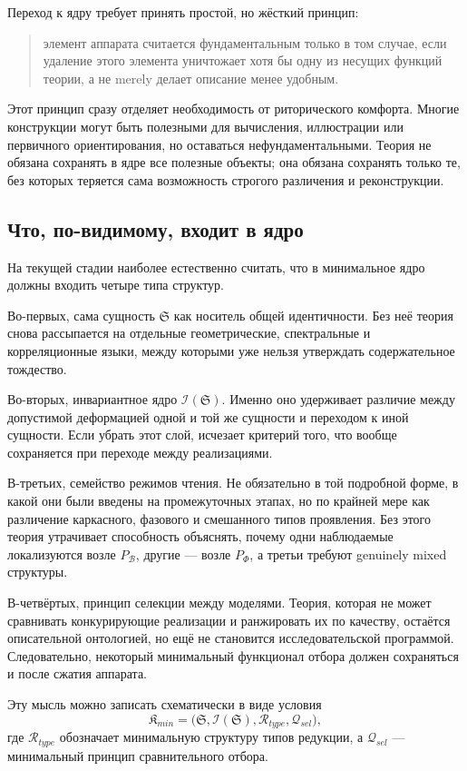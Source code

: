 \documentclass[12pt,a4paper]{article}
\begin{document}
Переход к ядру требует принять простой, но жёсткий принцип:
\begin{quote}
элемент аппарата считается фундаментальным только в том случае, если удаление этого элемента уничтожает хотя бы одну из несущих функций теории, а не merely делает описание менее удобным.
\end{quote}

Этот принцип сразу отделяет необходимость от риторического комфорта. Многие конструкции могут быть полезными для вычисления, иллюстрации или первичного ориентирования, но оставаться нефундаментальными. Теория не обязана сохранять в ядре все полезные объекты; она обязана сохранять только те, без которых теряется сама возможность строгого различения и реконструкции.

\subsection{Что, по-видимому, входит в ядро}

На текущей стадии наиболее естественно считать, что в минимальное ядро должны входить четыре типа структур.

Во-первых, сама сущность \(\mathfrak{S}\) как носитель общей идентичности. Без неё теория снова рассыпается на отдельные геометрические, спектральные и корреляционные языки, между которыми уже нельзя утверждать содержательное тождество.

Во-вторых, инвариантное ядро \(\mathcal{I}(\mathfrak{S})\). Именно оно удерживает различие между допустимой деформацией одной и той же сущности и переходом к иной сущности. Если убрать этот слой, исчезает критерий того, что вообще сохраняется при переходе между реализациями.

В-третьих, семейство режимов чтения. Не обязательно в той подробной форме, в какой они были введены на промежуточных этапах, но по крайней мере как различение каркасного, фазового и смешанного типов проявления. Без этого теория утрачивает способность объяснять, почему одни наблюдаемые локализуются возле \(P_{\mathcal{B}}\), другие --- возле \(P_{\Phi}\), а третьи требуют genuinely mixed структуры.

В-четвёртых, принцип селекции между моделями. Теория, которая не может сравнивать конкурирующие реализации и ранжировать их по качеству, остаётся описательной онтологией, но ещё не становится исследовательской программой. Следовательно, некоторый минимальный функционал отбора должен сохраняться и после сжатия аппарата.

Эту мысль можно записать схематически в виде условия
\begin{equation}
\mathfrak{K}_{min}=\bigl(\mathfrak{S},\mathcal{I}(\mathfrak{S}),\mathcal{R}_{type},\mathcal{Q}_{sel}\bigr),
\end{equation}
где \(\mathcal{R}_{type}\) обозначает минимальную структуру типов редукции, а \(\mathcal{Q}_{sel}\) --- минимальный принцип сравнительного отбора.
\end{document}
